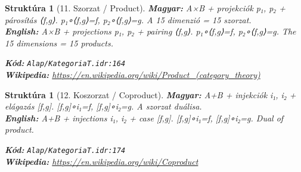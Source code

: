 \documentclass[11pt,a4paper,twocolumn]{article}
\newtheorem{struktura}[tetel]{Struktúra}
\begin{document}
\begin{struktura}[11. Szorzat / Product]

\textbf{Magyar:} A×B + projekciók p₁, p₂ + párosítás ⟨f,g⟩. p₁∘⟨f,g⟩=f, p₂∘⟨f,g⟩=g. A 15 dimenzió = 15 szorzat.\\

\textbf{English:} A×B + projections p₁, p₂ + pairing ⟨f,g⟩. p₁∘⟨f,g⟩=f, p₂∘⟨f,g⟩=g. The 15 dimensions = 15 products.\\

\begin{center}
\end{center}

\textbf{Kód:} \texttt{Alap/KategoriaT.idr:164}\\
\textbf{Wikipedia:} \url{https://en.wikipedia.org/wiki/Product_(category_theory)}

\end{struktura}

\vspace{0.5cm}

\begin{struktura}[12. Koszorzat / Coproduct]

\textbf{Magyar:} A+B + injekciók i₁, i₂ + elágazás [f,g]. [f,g]∘i₁=f, [f,g]∘i₂=g. A szorzat duálisa.\\

\textbf{English:} A+B + injections i₁, i₂ + case [f,g]. [f,g]∘i₁=f, [f,g]∘i₂=g. Dual of product.\\

\begin{center}
\end{center}

\textbf{Kód:} \texttt{Alap/KategoriaT.idr:174}\\
\textbf{Wikipedia:} \url{https://en.wikipedia.org/wiki/Coproduct}

\end{struktura}

\vspace{0.5cm}
\end{document}
